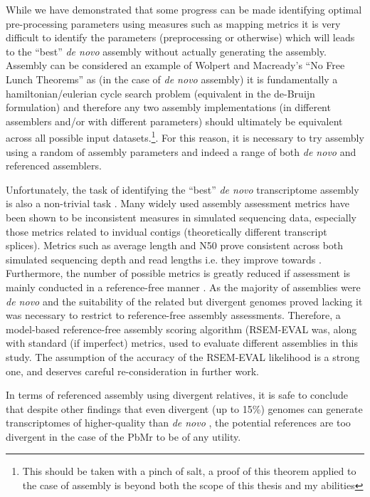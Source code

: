 While we have demonstrated that some progress can be made 
identifying optimal pre-processing parameters using measures such as mapping metrics 
it is very difficult to identify the parameters (preprocessing or otherwise) which will leads to the ``best'' 
\textit{de novo} assembly without actually generating the assembly.
  Assembly can be considered an example of Wolpert and Macready's ``No Free Lunch Theorems'' \citep{Wolpert1995,Wolpert1997} 
  as (in the case of \textit{de novo} assembly) it is fundamentally a hamiltonian/eulerian cycle search problem (equivalent
    in the de-Bruijn formulation) and therefore any two assembly implementations (in different assemblers and/or
    with different parameters) should ultimately be equivalent across all possible input datasets.\footnote{
    This should be taken with a pinch of salt, a proof of this theorem applied to the case of assembly is beyond
both the scope of this thesis and my abilities}.  For this reason, it is necessary to try
assembly using a random of assembly parameters and indeed a range of both \textit{de novo} and referenced assemblers. 

Unfortunately, the task of identifying the ``best'' \textit{de novo} transcriptome assembly is also a non-trivial 
task \citep{Neil2013c}.  Many widely used assembly assessment metrics have been shown to be
inconsistent measures in simulated sequencing data, especially those metrics related to invidual
contigs (theoretically different transcript splices).  Metrics such as average length and N50
prove consistent across both simulated sequencing depth and read lengths i.e. they improve 
towards \citep{Neil2013c}.  Furthermore, the number of possible metrics is greatly reduced
if assessment is mainly conducted in a reference-free manner \citep{Li2014}.  As the majority of
assemblies were \textit{de novo} and the suitability of the related but divergent genomes
proved lacking it was necessary to restrict to reference-free assembly assessments.  
Therefore, a model-based reference-free assembly scoring algorithm (RSEM-EVAL \citep{Li2014} was,
 along with standard (if imperfect) metrics, used to evaluate different assemblies in this study.
 The assumption of the accuracy of the RSEM-EVAL likelihood is a strong one, and deserves careful re-consideration
 in further work.

In terms of referenced assembly using divergent relatives, 
it is safe to conclude that despite other findings that even divergent 
(up to 15\%) genomes can generate transcriptomes of higher-quality
than \textit{de novo} \citep{Vijay2013}, the potential references
are too divergent in the case of the PbMr to be of any utility.
    
